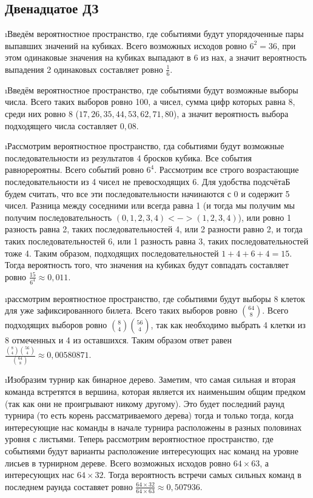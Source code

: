 \subsection{Двенадцатое ДЗ}

\i Введём вероятностное пространство, где событиями будут упорядоченные пары выпавших значений на кубиках. Всего возможных исходов ровно $6^2 = 36$, при этом одинаковые значения на кубиках выпадают в $6$ из нах, а значит вероятность выпадения 2 одинаковых составляет ровно $\frac{1}{6}$.

\i Введём вероятностное пространство, где событиями будут возможные выборы числа. Всего таких выборов ровно 100, а чисел, сумма цифр которых равна 8, среди них ровно $8$ ($17, 26, 35, 44, 53, 62, 71, 80$), а значит вероятность выбора подходящего числа составляет $0{,}08$.

\i Рассмотрим вероятностное пространство, гда событиями будут возможные последовательности из результатов 4 бросков кубика. Все события равнорероятны. Всего событий ровно $6^4$. Рассмотрим все строго возрастающие последовательности из 4 чисел не превосходящих 6. Для удобства подсчётаБ будем считать, что все эти последовательности начинаются с 0 и содержит 5 чисел. Разница между соседними или всегда равна 1 (и тогда мы получим мы получим последовательность $(0, 1, 2, 3, 4) <-> (1, 2, 3, 4)$), или ровно 1 разность равна 2, таких последовательностей 4, или 2 разности равно 2, и тогда таких последовательностей 6, или 1 разность равна 3, таких последовательностей тоже 4. Таким образом, подходящих последовательностей $1+4+6+4 = 15$. Тогда вероятность того, что значения на кубиках будут совпадать составляет ровно $\frac{15}{6^4} \approx 0,011$.

\i рассмотрим вероятностное пространство, где событиями будут выборы 8 клеток для уже зафиксированного билета. Всего таких выборов ровно $\binom{64}{8}$. Всего подходящих выборов ровно $\binom{8}{4}\binom{56}{4}$, так как необходимо выбрать 4 клетки из 8 отмеченных и 4 из оставшихся. Таким образом ответ равен $\frac{\binom{8}{4}\binom{56}{4}}{\binom{64}{8}} \approx 0{,}00580871$.

\i Изобразим турнир как бинарное дерево. Заметим, что самая сильная и вторая команда встретятся в вершина, которая является их наименьшим общим предком (так как они не проигрывают никому другому). Это будет последний раунд турнира (то есть корень рассматриваемого дерева) тогда и только тогда, когда интересующие нас команды в начале турнира расположены в разных половинах уровня с листьями. Теперь рассмотрим вероятностное пространство, где событиями будут варианты расположение интересующих нас команд на уровне лисьев в турнирном дереве. Всего возможных исходов ровно $64 \times 63$, а интересующих нас $64 \times 32$. Тогда вероятность встречи самых сильных команд в последнем раунда составяет ровно $\frac{64\times32}{64\times63} \approx 0{,}507936$.

